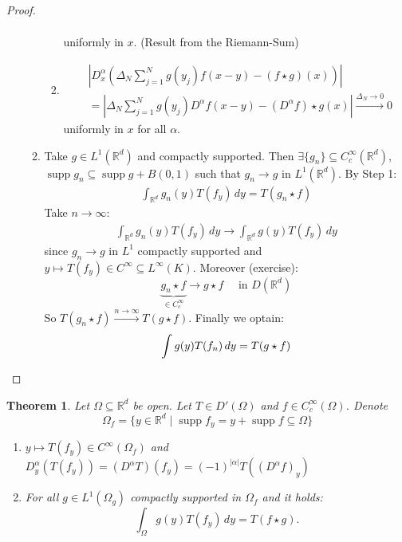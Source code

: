 \documentclass{report}
\theoremstyle{tommy}
\newtheorem{thm}[defn]{Theorem}
\newcommand{\supp}{\operatorname{supp}}
\begin{document}
\begin{proof}
\begin{enumerate}[label=\alph*)]
\begin{enumerate}[label=Step \arabic*:]
\begin{enumerate}[label=\arabic*)]
\begin{align*}
          \end{align*}
          uniformly in \(x\). (Result from the Riemann-Sum)
          \item \begin{align*}
            &\left| D_x^\alpha(\Delta_N \sum_{j=1}^N g(y_j) f(x-y) - (f \star g)(x)) \right| \\
            &= \left| \Delta_N \sum_{j=1}^N g(y_j) D^\alpha f(x-y) - (D^\alpha f)\star g(x) \right| \xrightarrow{\Delta_N \to 0} 0
          \end{align*}
          uniformly in \(x\) for all \(\alpha\).
        \end{enumerate}
        \item Take \(g \in L^1(\mathbb{R}^d)\) and compactly supported. Then \(\exists \{g_n\} \subseteq C_c^\infty(\mathbb{R}^d)\), \(\supp g_n \subseteq \supp g + B(0,1)\) such that \(g_n \to g\) in \(L^1(\mathbb{R}^d)\). By Step 1: 
        \begin{align*}
          \int_{\mathbb{R}^d} g_n(y) T(f_y) \, dy = T(g_n \star f)
        \end{align*}
        Take \(n \to \infty\):
        \begin{align*}
          \int_{\mathbb{R}^d} g_n(y) T(f_y) \, dy \to \int_{\mathbb{R}^d} g(y) T(f_y) \, dy
        \end{align*}
        since \(g_n \to g\) in \(L^1\) compactly supported and \(y \mapsto T(f_y) \in C^\infty \subseteq L^\infty(K)\). Moreover (exercise):
        \[\underbrace{g_n \star f}_{\in C_c^\infty} \to g \star f \quad \text{ in } D(\mathbb{R}^d)\]
        So \(T(g_n \star f) \xrightarrow{n \to \infty} T(g \star f)\).
        Finally we optain:
        \[\int g(y) T(f_n) \, dy = T(g \star f)\qedhere\] 
      \end{enumerate}
  \end{enumerate}
  \end{proof}
  
  \begin{thm}
    Let \(\Omega \subseteq \mathbb{R}^d\) be open. Let \(T \in D'(\Omega)\) and \(f \in C_c^\infty(\Omega)\). Denote
    \[\Omega_f = \{y \in \mathbb{R}^d \mid \supp f_y = y + \supp f \subseteq \Omega\}\]
    \begin{enumerate}[label=\alph*)]
      \item \(y \mapsto T(f_y) \in C^\infty(\Omega_f)\) and \(D_y^\alpha(T(f_y)) = (D^\alpha T)(f_y) = (-1)^{|\alpha|}T((D^\alpha f)_y)\)
      \item For all \(g \in L^1(\Omega_g)\) compactly supported in \(\Omega_f\) and it holds:
      \[\int_\Omega g(y) T(f_y) \, dy = T(f \star g).\]
    \end{enumerate}
  \end{thm}
  
\end{document}
